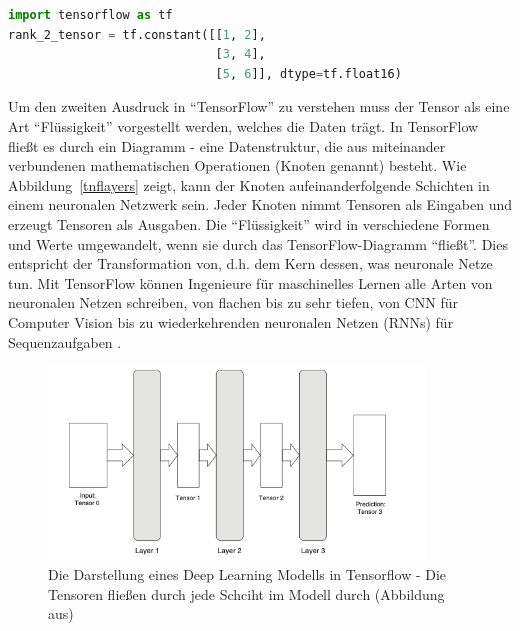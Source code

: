 \begin{lstlisting}[language=Python,caption=Beispiel eines Tensors in TensorFlow]
import tensorflow as tf
rank_2_tensor = tf.constant([[1, 2],
                             [3, 4],
                             [5, 6]], dtype=tf.float16)
\end{lstlisting}\label{Label3}

Um den zweiten Ausdruck in \enquote{TensorFlow} zu verstehen muss der Tensor als eine Art \enquote{Flüssigkeit} vorgestellt werden, welches die Daten trägt. In TensorFlow fließt es durch ein Diagramm - eine Datenstruktur, die aus miteinander verbundenen mathematischen Operationen (Knoten genannt) besteht. Wie Abbildung~\ref{tnflayers} zeigt, kann der Knoten aufeinanderfolgende Schichten in einem neuronalen Netzwerk sein. Jeder Knoten nimmt Tensoren als Eingaben und erzeugt Tensoren als Ausgaben. Die \enquote{Flüssigkeit} wird in verschiedene Formen und Werte umgewandelt, wenn sie durch das TensorFlow-Diagramm \enquote{fließt}. Dies entspricht der Transformation von, d.h. dem Kern dessen, was neuronale Netze tun. Mit TensorFlow können Ingenieure für maschinelles Lernen alle Arten von neuronalen Netzen schreiben, von flachen bis zu sehr tiefen, von CNN für Computer Vision bis zu wiederkehrenden neuronalen Netzen (RNNs) für Sequenzaufgaben .

 \begin{figure}[H]
     \centering
     \includegraphics[width=10cm]{kapitel5/tflayers.png}
     \caption[Die Darstellung eines Deep Learning Modells in Tensorflow]{Die Darstellung eines Deep Learning Modells in Tensorflow - Die Tensoren fließen durch jede Schciht im Modell durch (Abbildung aus)}
     \label{Kap5:tnflayers}
 \end{figure}


